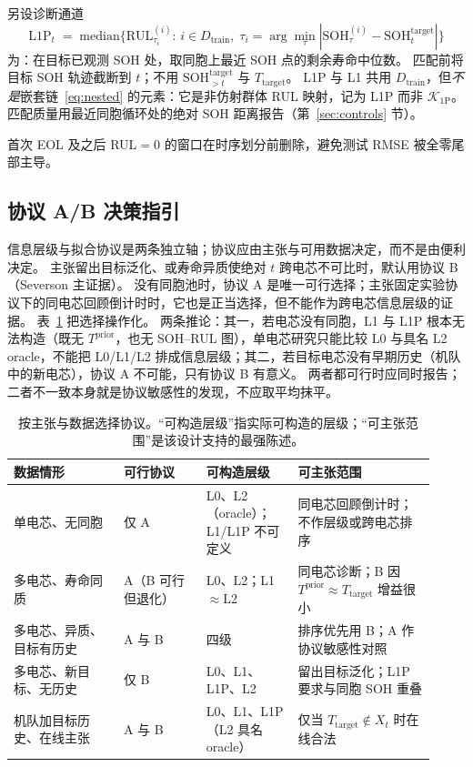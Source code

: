 \documentclass[UTF8,a4paper,12pt]{ctexart}
\begin{document}
另设诊断通道
\begin{equation}
\label{eq:l1p}
\mathrm{L1P}_t \;=\; \mathrm{median}\bigl\{\mathrm{RUL}_{\tau_i}^{(i)}:\, i\in D_{\mathrm{train}},\;
\tau_i=\arg\min_{\tau}|\mathrm{SOH}_\tau^{(i)}-\mathrm{SOH}_t^{\mathrm{target}}|\bigr\}
\end{equation}
为：在目标已观测 SOH 处，取同胞上最近 SOH 点的剩余寿命中位数。
匹配前将目标 SOH 轨迹截断到 $t$；不用 $\mathrm{SOH}_{>t}^{\mathrm{target}}$ 与 $T_{\mathrm{target}}$。
L1P 与 L1 共用 $D_{\mathrm{train}}$，但\emph{不是}嵌套链~\eqref{eq:nested} 的元素：它是非仿射群体 RUL 映射，记为 L1P 而非 $\mathcal{K}_{1\mathrm{P}}$。
匹配质量用最近同胞循环处的绝对 SOH 距离报告（第~\ref{sec:controls} 节）。

首次 EOL 及之后 RUL$=0$ 的窗口在时序划分前删除，避免测试 RMSE 被全零尾部主导。

\subsection{协议 A/B 决策指引}
\label{sec:decision}

信息层级与拟合协议是两条独立轴；协议应由主张与可用数据决定，而不是由便利决定。
主张留出目标泛化、或寿命异质使绝对 $t$ 跨电芯不可比时，默认用协议 B（Severson 主证据）。
没有同胞池时，协议 A 是唯一可行选择；主张固定实验协议下的同电芯回顾倒计时时，它也是正当选择，但不能作为跨电芯信息层级的证据。
表~\ref{tab:decision} 把选择操作化。
两条推论：其一，若电芯没有同胞，L1 与 L1P 根本无法构造（既无 $T^{\mathrm{prior}}$，也无 SOH--RUL 图），单电芯研究只能比较 L0 与具名 L2 oracle，不能把 L0/L1/L2 排成信息层级；其二，若目标电芯没有早期历史（机队中的新电芯），协议 A 不可能，只有协议 B 有意义。
两者都可行时应同时报告；二者不一致本身就是协议敏感性的发现，不应取平均抹平。

\begin{table}[htbp]
\centering
\small
\caption{按主张与数据选择协议。“可构造层级”指实际可构造的层级；“可主张范围”是该设计支持的最强陈述。}
\label{tab:decision}
\begin{tabular}{@{}p{0.24\linewidth}p{0.18\linewidth}p{0.20\linewidth}p{0.30\linewidth}@{}}
\toprule
数据情形 & 可行协议 & 可构造层级 & 可主张范围 \\
\midrule
单电芯、无同胞 & 仅 A & L0、L2（oracle）；L1/L1P 不可定义 & 同电芯回顾倒计时；不作层级或跨电芯排序 \\
多电芯、寿命同质 & A（B 可行但退化） & L0、L2；L1$\approx$L2 & 同电芯诊断；B 因 $T^{\mathrm{prior}}\approx T_{\mathrm{target}}$ 增益很小 \\
多电芯、异质、目标有历史 & A 与 B & 四级 & 排序优先用 B；A 作协议敏感性对照 \\
多电芯、新目标、无历史 & 仅 B & L0、L1、L1P、L2 & 留出目标泛化；L1P 要求与同胞 SOH 重叠 \\
机队加目标历史、在线主张 & A 与 B & L0、L1、L1P（L2 具名 oracle） & 仅当 $T_{\mathrm{target}}\notin X_t$ 时在线合法 \\
\bottomrule
\end{tabular}
\end{table}
\end{document}
